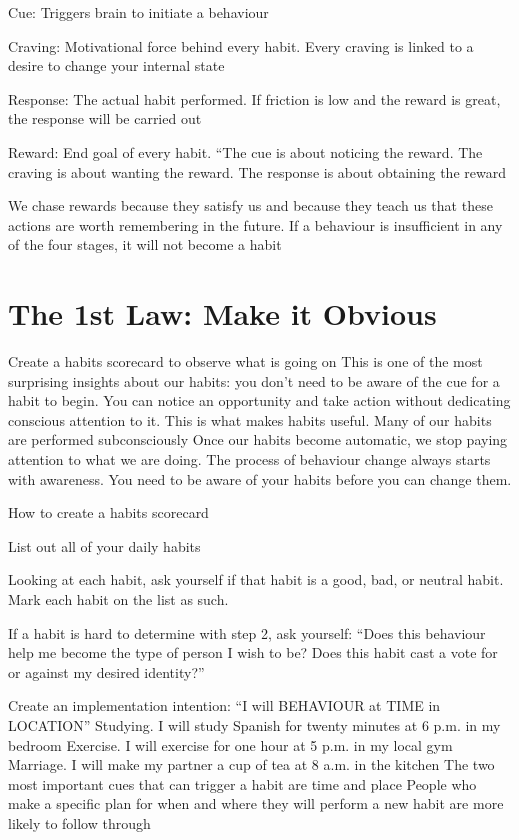 \documentclass[10pt,twocolumn]{../notes}
\begin{document}
\begin{Olist}{}
  \item Cue: Triggers brain to initiate a behaviour
  \item Craving: Motivational force behind every habit. Every craving is linked to a desire to change your internal state
  \item Response: The actual habit performed. If friction is low and the reward is great, the response will be carried out
  \item Reward: End goal of every habit. “The cue is about noticing the reward. The craving is about wanting the reward. The response is about obtaining the reward
\end{Olist}
\Fact We chase rewards because they satisfy us and because they teach us that these actions are worth remembering in the future.
\Fact If a behaviour is insufficient in any of the four stages, it will not become a habit

\section{The 1st Law: Make it Obvious}
\Advice Create a habits scorecard to observe what is going on
\Quote This is one of the most surprising insights about our habits: you don’t need to be aware of the cue for a habit to begin. You can notice an opportunity and take action without dedicating conscious attention to it. This is what makes habits useful.
\Fact Many of our habits are performed subconsciously
\Quote Once our habits become automatic, we stop paying attention to what we are doing.
\Quote The process of behaviour change always starts with awareness. You need to be aware of your habits before you can change them.
\begin{Olist}{How to create a habits scorecard}
  \item List out all of your daily habits
  \item Looking at each habit, ask yourself if that habit is a good, bad, or neutral habit. Mark each habit on the list as such.
  \item If a habit is hard to determine with step 2, ask yourself: “Does this behaviour help me become the type of person I wish to be? Does this habit cast a vote for or against my desired identity?”
\end{Olist}
\Advice Create an implementation intention: “I will BEHAVIOUR at TIME in LOCATION”
\Example Studying. I will study Spanish for twenty minutes at 6 p.m. in my bedroom
\Example Exercise. I will exercise for one hour at 5 p.m. in my local gym
\Example Marriage. I will make my partner a cup of tea at 8 a.m. in the kitchen
\Fact The two most important cues that can trigger a habit are time and place
\Quote People who make a specific plan for when and where they will perform a new habit are more likely to follow through
\end{document}
